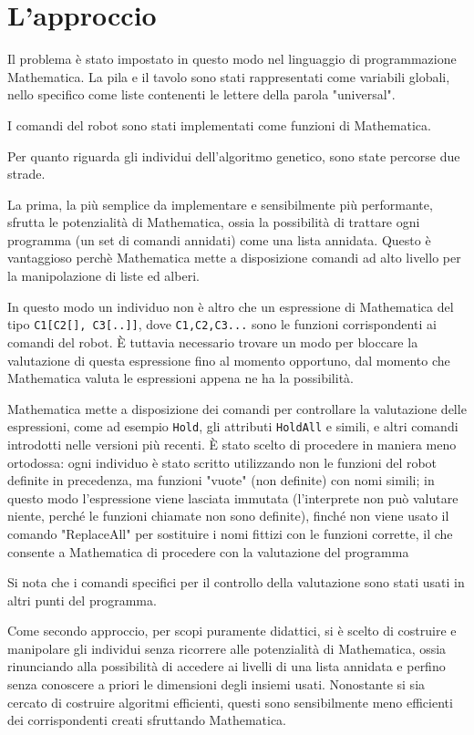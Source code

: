 \documentclass[paper=a4, fontsize=11pt]{scrartcl}
\numberwithin{equation}{section}		%
\numberwithin{figure}{section}			%
\numberwithin{table}{section}				%
\begin{document}
\section{L'approccio}
Il problema è stato impostato in questo modo nel linguaggio di programmazione Mathematica. La pila e il tavolo sono stati rappresentati come variabili globali, nello specifico come liste contenenti le lettere della parola "universal".

I comandi del robot sono stati implementati come funzioni di Mathematica. 

Per quanto riguarda gli individui dell'algoritmo genetico, sono state percorse due strade.

La prima, la più semplice da implementare e sensibilmente più performante, sfrutta le potenzialità di Mathematica, ossia la possibilità di trattare ogni programma (un set di comandi annidati) come una lista annidata. Questo è vantaggioso perchè Mathematica mette a disposizione comandi ad alto livello per la manipolazione di liste ed alberi.

In questo modo un individuo non è altro che un espressione di Mathematica del tipo \texttt{C1[C2[], C3[..]]}, dove \texttt{C1,C2,C3...} sono le funzioni corrispondenti ai comandi del robot. È tuttavia necessario trovare un modo per bloccare la valutazione di questa espressione fino al momento opportuno, dal momento che Mathematica valuta le espressioni appena ne ha la possibilità.
  
Mathematica mette a disposizione dei comandi per controllare la valutazione delle espressioni, come ad esempio \texttt{Hold}, gli attributi \texttt{HoldAll} e simili, e altri comandi introdotti nelle versioni più recenti. È stato scelto di procedere in maniera meno ortodossa: ogni individuo è stato scritto utilizzando non le funzioni del robot definite in precedenza, ma funzioni "vuote" (non definite) con nomi simili; in questo modo l'espressione viene lasciata immutata (l'interprete non può valutare niente, perché le funzioni chiamate non sono definite), finché non viene usato il comando "ReplaceAll" per sostituire i nomi fittizi con le funzioni corrette, il che consente a Mathematica di procedere con la valutazione del programma

Si nota che i comandi specifici per il controllo della valutazione sono stati usati in altri punti del programma.

Come secondo approccio, per scopi puramente didattici, si è scelto di costruire e manipolare gli individui senza ricorrere alle potenzialità di Mathematica, ossia rinunciando alla possibilità di accedere ai livelli di una lista annidata e perfino senza conoscere a priori le dimensioni degli insiemi usati. Nonostante si sia cercato di costruire algoritmi efficienti, questi sono sensibilmente meno efficienti dei corrispondenti creati sfruttando Mathematica.
\end{document}
